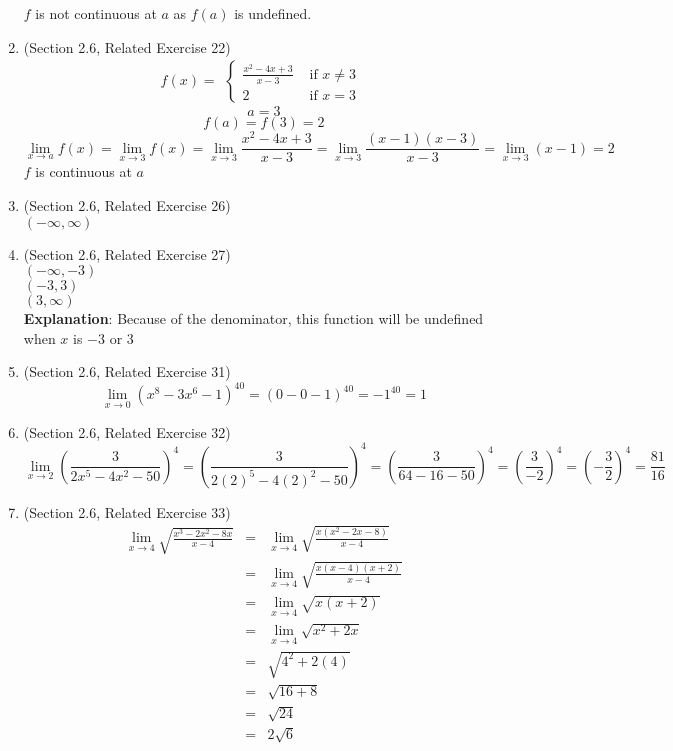 \documentclass{article}
\begin{document}
\begin{enumerate}
		$f$ is not continuous at $a$ as $f(a)$ is undefined.
	\item (Section 2.6, Related Exercise 22)
		$$f(x) = \begin{aligned}
			\begin{cases}
				\frac{x^2 - 4x + 3}{x - 3} &\text{ if } x \neq 3 \\
				2 &\text{ if } x = 3
			\end{cases}
		\end{aligned}$$
		$$a = 3$$
		$$f(a) = f(3) = 2$$
		$$\lim_{x \to a}{f(x)} = \lim_{x \to 3}{f(x)} = \lim_{x \to 3}{\frac{x^2 - 4x + 3}{x - 3}} = \lim_{x \to 3}{\frac{(x - 1)(x - 3)}{x - 3}} = \lim_{x \to 3}{(x - 1)} = 2$$
		$f$ is continuous at $a$
	\item (Section 2.6, Related Exercise 26)
		\\ $(- \infty, \infty)$
	\item (Section 2.6, Related Exercise 27)
		\\ $(- \infty, -3)$
		\\ $(-3, 3)$
		\\ $(3, \infty)$
		\\ \textbf{Explanation}: Because of the denominator, this function will be undefined when $x$ is $-3$ or $3$
	\item (Section 2.6, Related Exercise 31)
		$$\lim_{x \to 0}{(x^8 - 3x^6 - 1)^{40}} = (0 - 0 - 1)^{40} = -1^{40} = 1$$
	\item (Section 2.6, Related Exercise 32)
		$$\lim_{x \to 2}{\left (\frac{3}{2x^5 - 4x^2 - 50} \right )^4} = \left (\frac{3}{2(2)^5 - 4(2)^2 - 50} \right )^4 = \left (\frac{3}{64 - 16 - 50} \right )^4 = \left (\frac{3}{-2} \right )^4 = \left (- \frac{3}{2} \right )^4 = \frac{81}{16}$$
	\item (Section 2.6, Related Exercise 33)
		\begin{eqnarray}
			\lim_{x \to 4}{\sqrt{\frac{x^3 - 2x^2 - 8x}{x - 4}}} &=& \lim_{x \to 4}{\sqrt{\frac{x(x^2 - 2x - 8)}{x - 4}}} \\
			&=& \lim_{x \to 4}{\sqrt{\frac{x(x - 4)(x + 2)}{x - 4}}} \\
			&=& \lim_{x \to 4}{\sqrt{x(x + 2)}} \\
			&=& \lim_{x \to 4}{\sqrt{x^2 + 2x}} \\
			&=& \sqrt{4^2 + 2(4)} \\
			&=& \sqrt{16 + 8} \\
			&=& \sqrt{24} \\
			&=& 2\sqrt{6}
		\end{eqnarray}

\end{enumerate}
\end{document}
